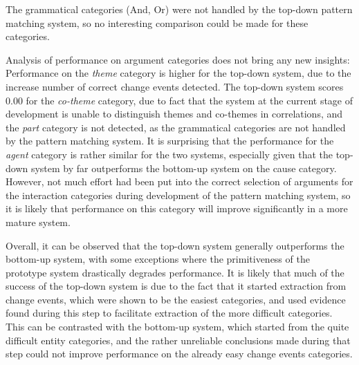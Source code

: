 The grammatical categories (And, Or) were not handled by the top-down pattern matching system, so no interesting comparison could be made for these categories.

Analysis of performance on argument categories does not bring any new insights: Performance on the \emph{theme} category is higher for the top-down system, due to the increase number of correct change events detected. The top-down system scores 0.00 for the \emph{co-theme} category, due to fact that the system at the current stage of development is unable to distinguish themes and co-themes in correlations, and the \emph{part} category is not detected, as the grammatical categories are not handled by the pattern matching system. It is surprising that the performance for the \emph{agent} category is rather similar for the two systems, especially given that the top-down system by far outperforms the bottom-up system on the cause category. However, not much effort had been put into the correct selection of arguments for the interaction categories during development of the pattern matching system, so it is likely that performance on this category will improve significantly in a more mature system.

Overall, it can be observed that the top-down system generally outperforms the bottom-up system, with some exceptions where the primitiveness of the prototype system drastically degrades performance. It is likely that much of the success of the top-down system is due to the fact that it started extraction from change events, which were shown to be the easiest categories, and used evidence found during this step to facilitate extraction of the more difficult categories. This can be contrasted with the bottom-up system, which started from the quite difficult entity categories, and the rather unreliable conclusions made during that step could not improve performance on the already easy change events categories.